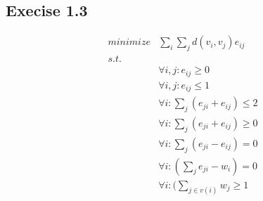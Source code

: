 \documentclass[11pt,a4paper]{article}
\begin{document}
\subsection{Execise 1.3}
\begin{align*}
    minimize & \sum_i \sum_j d(v_i, v_j) e_{ij} \\
    s.t.     & \\
             & \forall i, j: e_{ij} \geq 0 \\
             & \forall i, j: e_{ij} \leq 1 \\
             & \forall i: \sum_j (e_{ji} + e_{ij}) \leq 2 \\
             & \forall i: \sum_j (e_{ji} + e_{ij}) \geq 0 \\
             & \forall i: \sum_j (e_{ji} - e_{ij}) = 0 \\
             & \forall i: (\sum_j e_{ji} - w_i) = 0 \\
             & \forall i: (\sum_{j \in v(i)} w_j \geq 1 \\
\end{align*}



\end{document}

